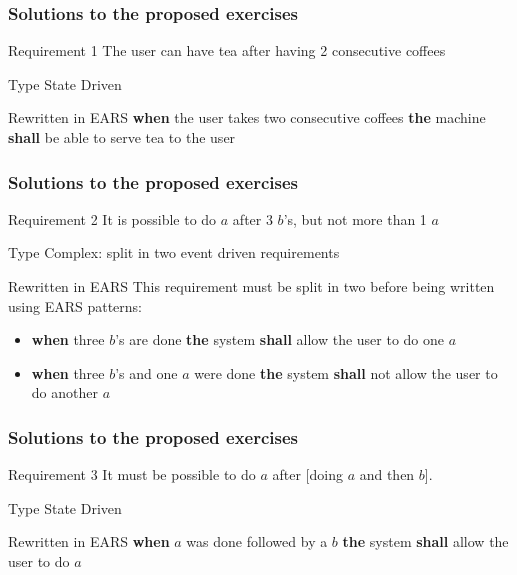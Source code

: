 \documentclass[aspectratio=169]{beamer}
\newcommand{\earse}[3]{{\bf \color{mygreen}when} {#1} {\bf \color{mypurple}the} {#2} {\bf \color{mypurple}shall} {#3}}
\begin{document}
\begin{frame}
  \frametitle{Solutions to the proposed exercises}
  \begin{block}{Requirement 1}
    The user can have \alert{tea} after having 2 consecutive \alert{coffees}
  \end{block}
  \begin{block}{Type}
  State Driven 
  \end{block}
  \begin{block}{Rewritten in EARS}
   \earse{the user takes two consecutive coffees}{machine}{be able to serve tea to the user}
  \end{block}
\end{frame}

\begin{frame}
  \frametitle{Solutions to the proposed exercises}
  \begin{block}{Requirement 2}
    It is possible to do \alert{$a$} after 3 \alert{$b$}'s, but not more than 1 \alert{$a$}
  \end{block}
  \begin{block}{Type}
  Complex: split in two event driven requirements  
  \end{block}
  \begin{block}{Rewritten in EARS}
   This requirement must be split in two before being written using EARS patterns:
   \begin{itemize}
   \item \earse{three \alert{$b$}'s are done}{system}{allow the user to do one \alert{$a$}}
   \item \earse{three \alert{$b$}'s and one \alert{$a$} were done}{system}{not allow the user to do another \alert{$a$}}
   \end{itemize}
  \end{block}
\end{frame}

\begin{frame}
  \frametitle{Solutions to the proposed exercises}
  \begin{block}{Requirement 3}
    It must be possible to do \alert{$a$} after [doing \alert{$a$} and then \alert{$b$}].
  \end{block}
  \begin{block}{Type}
   State Driven
  \end{block}
  \begin{block}{Rewritten in EARS}
   \earse{\alert{$a$} was done followed by a \alert{$b$}}{system}{allow the user to do \alert{$a$}}
  \end{block}
\end{frame}
\end{document}
